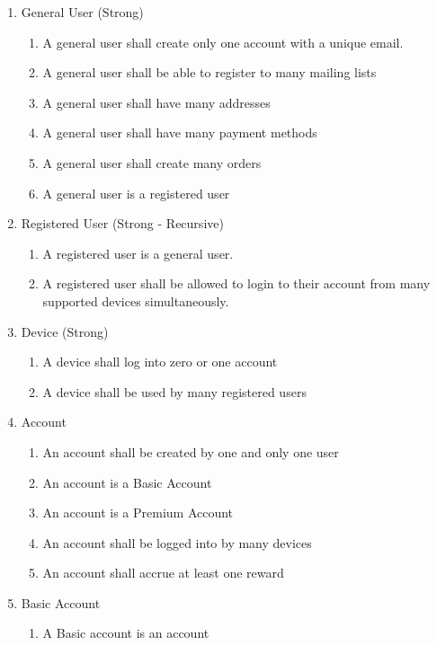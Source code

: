 \documentclass{article}
\begin{document}
\begin{enumerate}

\item General User (Strong)
\begin{enumerate}
	\item A general user shall create only one account with a unique email.
	\item A general user shall be able to register to many mailing lists
	\item A general user shall have many addresses
	\item A general user shall have many payment methods
	\item A general user shall create many orders
	\item A general user is a registered user
\end{enumerate}
	
\item Registered User (Strong - Recursive)
\begin{enumerate}
	\item A registered user is a general user.
	\item A registered user shall be allowed to login to their account from many supported devices simultaneously.
\end{enumerate}
	
\item Device (Strong)
\begin{enumerate}
	\item A device shall log into zero or one account
	\item A device shall be used by many registered users
\end{enumerate}

\item Account
\begin{enumerate}
	\item An account shall be created by one and only one user
	\item An account is a Basic Account
	\item An account is a Premium Account
	\item An account shall be logged into by many devices
	\item An account shall accrue at least one reward
\end{enumerate}
	
\item Basic Account
\begin{enumerate}
	\item A Basic account is an account
\end{enumerate}
	

\end{enumerate}
\end{document}
